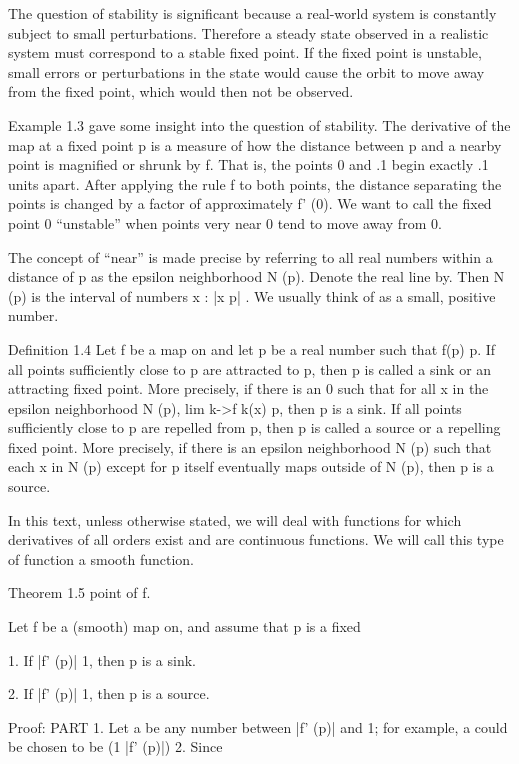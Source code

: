 \documentclass[12pt]{article}
\begin{document}
The question of stability is significant because a real-world system is constantly subject to small 
perturbations. Therefore a steady state observed in a realistic system must correspond to a stable fixed 
point. If the fixed point is unstable, small errors or perturbations in the state would cause the orbit to 
move away from the fixed point, which would then not be observed.

Example 1.3 gave some insight into the question of stability. The derivative of the map at a fixed point p 
is a measure of how the distance between p and a nearby point is magnified or shrunk by f. That is, the 
points 0 and .1 begin exactly .1 units apart. After applying the rule f to both points, the distance 
separating the points is changed by a factor of approximately f' (0). We want to call the fixed point 0 
“unstable” when points very near 0 tend to move away from 0.

The concept of “near” is made precise by referring to all real numbers within a distance  of p as the 
epsilon neighborhood N  (p). Denote the real line by. Then N  (p) is the interval of numbers x  : |x  p|     
. We usually think of  as a small, positive number.

Definition 1.4 Let f be a map on and let p be a real number such that f(p)  p. If all points sufficiently 
close to p are attracted to p, then p is called a
sink or an attracting fixed point. More precisely, if there is an    0 such that for all x in the epsilon 
neighborhood N  (p), lim k->f k(x)  p, then p is a sink. If all points sufficiently close to p are repelled 
from p, then p is called a source or a repelling fixed point. More precisely, if there is an epsilon 
neighborhood N  (p) such that each x in N  (p) except for p itself eventually maps outside of N  (p), then 
p is a source.

In this text, unless otherwise stated, we will deal with functions for which derivatives of all orders 
exist and are continuous functions. We will call this type of function a smooth function.

Theorem 1.5 point of f.

Let f be a (smooth) map on, and assume that p is a fixed

1. If |f' (p)|   1, then p is a sink.

2. If |f' (p)| 
 1, then p is a source.

Proof: PART 1. Let a be any number between |f' (p)| and 1; for example, a could be chosen to be (1 |f' 
(p)|)  2. Since
\end{document}
